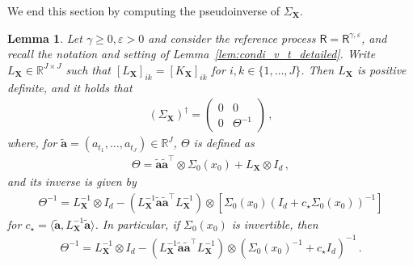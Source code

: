 \documentclass[12pt]{article}
\theoremstyle{plain}
\theoremstyle{plain}
\theoremstyle{remark}
\newcommand{\R}{\mathbb{R}}
\newcommand{\eps}{\varepsilon}
\newcommand{\1}{\bm{1}}
\theoremstyle{plain}
\newtheorem{lemma}[theorem]{Lemma}
\theoremstyle{definition}
\theoremstyle{remark}
\begin{document}
We end this section by computing the pseudoinverse of $\Sigma_{\bm{X}}$.
\begin{lemma}
  \label{lem:pseudo_inverse}
Let $\gamma \geq 0, \eps > 0$ and consider the reference process $\mathsf R = \mathsf R^{\gamma,\eps}$, and recall the notation and setting of Lemma~\ref{lem:condi_v_t_detailed}. Write $L_{\bm X} \in \R^{J\times J}$ such that $[L_{\bm X}]_{ik} = [K_{\bm X}]_{ik}$ for $i,k \in \{1,\ldots,J\}$. Then $L_{\bm X}$ is positive definite, and it holds that
\begin{align}\label{eq:cov_pinv}
    (\Sigma_{\bm X})^\dagger = \begin{pmatrix}
        0 & 0 \\
        0 & \Theta^{-1}
    \end{pmatrix}\,,
\end{align}
where, for $\tilde {\bm a} = (a_{t_1}, \ldots, a_{t_J}) \in \R^J$, $\Theta$ is defined as
\begin{align*}
    \Theta = \tilde{\bm a} \tilde{\bm a}^\top \otimes \Sigma_0(x_0) + L_{\bm X}\otimes I_d\,,
\end{align*}
and its inverse is given by
\begin{align}\label{eq:theta_t_inv}
    \Theta^{-1} = L_{\bm X}^{-1} \otimes I_d - (L_{\bm X}^{-1} \tilde{\bm a}\tilde{\bm a}^\top L_{\bm X}^{-1})\otimes [\Sigma_0(x_0)(I_d + c_\star \Sigma_0(x_0))^{-1}]
\end{align}
for  $c_\star = \langle \tilde{\bm a}, L_{\bm X}^{-1} \tilde{\bm a}\rangle$. In particular, if $\Sigma_0(x_0)$ is invertible, then
\begin{align*}
    \Theta^{-1} = L_{\bm X}^{-1} \otimes I_d - (L_{\bm X}^{-1} \tilde{\bm a}\tilde{\bm a}^\top L_{\bm X}^{-1})\otimes (\Sigma_0(x_0)^{-1} + c_\star I_d)^{-1}\,.
\end{align*}
\end{lemma}
\end{document}
